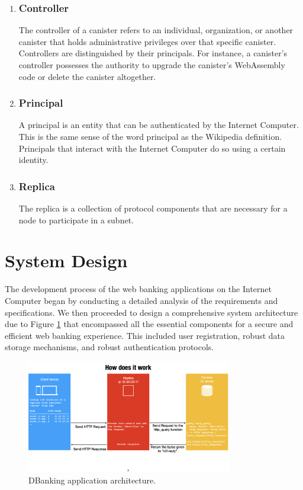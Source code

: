 \begin{enumerate}
    \item \subsubsection{Controller}The controller of a canister refers to an individual, organization, or another canister that holds administrative privileges over that specific canister. Controllers are distinguished by their principals. For instance, a canister's controller possesses the authority to upgrade the canister's WebAssembly \cite{webassemblywiki} code or delete the canister altogether.
    \item \subsubsection{Principal}
A principal is an entity that can be authenticated by the Internet Computer. This is the same sense of the word principal as the Wikipedia \cite{principalwiki} definition. Principals that interact with the Internet Computer do so using a certain identity.

    \item \subsubsection{Replica}
The replica is a collection of protocol components that are necessary for a node to participate in a subnet.
\end{enumerate}

\section{System Design}

The development process of the web banking applications on the Internet Computer began by conducting a detailed analysis of the requirements and specifications. We then proceeded to design a comprehensive system architecture due to Figure \ref{fig:DBanking application architecture.} that encompassed all the essential components for a secure and efficient web banking experience. This included user registration, robust data storage mechanisms, and robust authentication protocols.


\begin{figure}[H]
    \centering
    
    \includegraphics[width=0.8\textwidth]{IC-request.png}
    \caption{DBanking application architecture.}
    \label{fig:DBanking application architecture.}
\end{figure}


